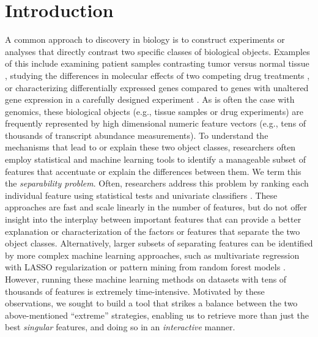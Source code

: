 
\section{Introduction}
\label{sec:intro}

A common approach to discovery in biology 
is to construct experiments or analyses that directly 
contrast two specific classes of biological objects. 
Examples of this include examining patient samples 
contrasting tumor versus normal tissue \needcite{}, 
studying the differences in molecular effects 
of two competing drug treatments \needcite{}, 
or characterizing differentially expressed genes 
compared to genes with unaltered gene expression 
in a carefully designed experiment \needcite{}. 
As is often the case with genomics, these 
biological objects (e.g., tissue samples or drug experiments) 
are frequently represented by high dimensional numeric feature vectors (e.g., tens of thousands of transcript abundance measurements). 
To understand the mechanisms that lead to or 
explain these two object classes, 
researchers often employ statistical and 
machine learning tools to identify a 
manageable subset of features that 
accentuate or explain the differences between them. 
We term this the {\em separability problem}. 
Often, researchers address this problem 
by ranking each individual feature 
using statistical tests \needcite{} 
and univariate classifiers \needcite{}. 
These approaches are fast 
and scale linearly in the number of features, 
but do not offer insight into the interplay 
between important features that can provide a better
explanation or characterization of the factors or features
that separate the two object classes. 
Alternatively, larger subsets of separating 
features can be identified by more complex machine learning approaches, such as multivariate regression with LASSO regularization \needcite{} or pattern mining from random forest models . 
However, running these machine learning methods on datasets with tens of thousands of features is extremely time-intensive. 
Motivated by these observations, 
we sought to build a tool that strikes a balance between the 
two above-mentioned ``extreme'' 
strategies, enabling us to retrieve more than just the best {\em singular} features, and doing so in an {\em interactive} manner.

